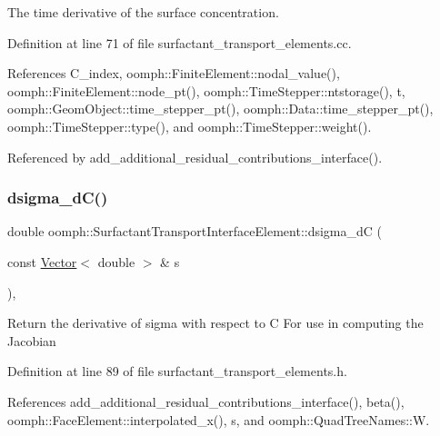 The time derivative of the surface concentration. 



Definition at line 71 of file surfactant\+\_\+transport\+\_\+elements.\+cc.



References C\+\_\+index, oomph\+::\+Finite\+Element\+::nodal\+\_\+value(), oomph\+::\+Finite\+Element\+::node\+\_\+pt(), oomph\+::\+Time\+Stepper\+::ntstorage(), t, oomph\+::\+Geom\+Object\+::time\+\_\+stepper\+\_\+pt(), oomph\+::\+Data\+::time\+\_\+stepper\+\_\+pt(), oomph\+::\+Time\+Stepper\+::type(), and oomph\+::\+Time\+Stepper\+::weight().



Referenced by add\+\_\+additional\+\_\+residual\+\_\+contributions\+\_\+interface().

\mbox{\label{classoomph_1_1SurfactantTransportInterfaceElement_ad39e6040101db7d9338928b3c2343623}} 
\subsubsection{\texorpdfstring{dsigma\+\_\+d\+C()}{dsigma\_dC()}}
{\footnotesize\ttfamily double oomph\+::\+Surfactant\+Transport\+Interface\+Element\+::dsigma\+\_\+dC (\begin{DoxyParamCaption}\item[{const \hyperlink{classoomph_1_1Vector}{Vector}$<$ double $>$ \&}]{s }\end{DoxyParamCaption})\hspace{0.3cm}{\ttfamily [inline]}, {\ttfamily [protected]}}

Return the derivative of sigma with respect to C For use in computing the Jacobian 

Definition at line 89 of file surfactant\+\_\+transport\+\_\+elements.\+h.



References add\+\_\+additional\+\_\+residual\+\_\+contributions\+\_\+interface(), beta(), oomph\+::\+Face\+Element\+::interpolated\+\_\+x(), s, and oomph\+::\+Quad\+Tree\+Names\+::W.



